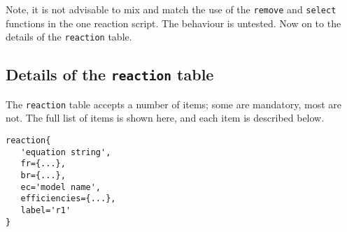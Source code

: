 Note, it is not advisable to mix and match the use of the \texttt{remove} and \texttt{select} functions in the one reaction script.
The behaviour is untested.
Now on to the details of the \texttt{reaction} table.

\subsection{Details of the \texttt{reaction} table}
The \texttt{reaction} table accepts a number of items; some are mandatory, most are not.
The full list of items is shown here, and each item is described below.
\begin{verbatim}
reaction{
   'equation string',
   fr={...},
   br={...},
   ec='model name',
   efficiencies={...},
   label='r1'
}
\end{verbatim}

